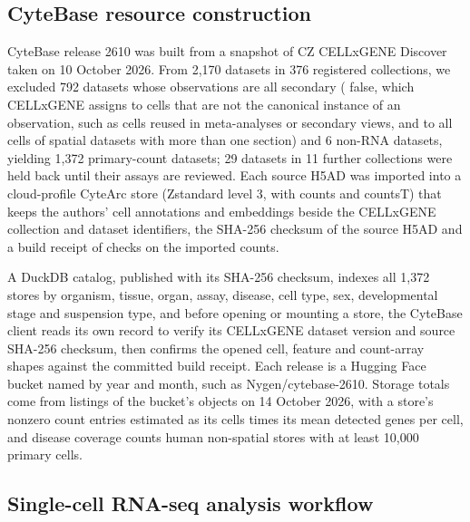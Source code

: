 \documentclass[11pt]{article}
\begin{document}
\subsection*{CyteBase resource construction}\label{sec:CyteBase construction}

CyteBase release 2610 was built from a snapshot of CZ CELLxGENE Discover~\cite{cellxgene2025} taken on 10 October 2026. From 2,170 datasets in 376 registered collections, we excluded 792 datasets whose observations are all secondary ( false, which CELLxGENE assigns to cells that are not the canonical instance of an observation, such as cells reused in meta-analyses or secondary views, and to all cells of spatial datasets with more than one section) and 6 non-RNA datasets, yielding 1,372 primary-count datasets; 29 datasets in 11 further collections were held back until their assays are reviewed. Each source H5AD was imported into a cloud-profile CyteArc store (Zstandard level 3, with counts and countsT) that keeps the authors' cell annotations and embeddings beside the CELLxGENE collection and dataset identifiers, the SHA-256 checksum of the source H5AD and a build receipt of checks on the imported counts.

A DuckDB catalog, published with its SHA-256 checksum, indexes all 1,372 stores by organism, tissue, organ, assay, disease, cell type, sex, developmental stage and suspension type, and before opening or mounting a store, the CyteBase client reads its own  record to verify its CELLxGENE dataset version and source SHA-256 checksum, then confirms the opened cell, feature and count-array shapes against the committed build receipt. Each release is a Hugging Face bucket named by year and month, such as Nygen/cytebase-2610. Storage totals come from listings of the bucket's objects on 14 October 2026, with a store's nonzero count entries estimated as its cells times its mean detected genes per cell, and disease coverage counts human non-spatial stores with at least 10,000 primary cells.

\subsection*{Single-cell RNA-seq analysis workflow}\label{sec:RNA analysis workflow}
\end{document}
